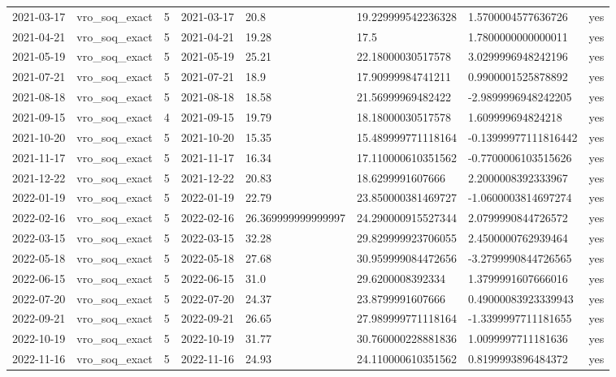 \begin{tabular}{llllllll}
2021-03-17 & vro\_soq\_exact & 5 & 2021-03-17 & 20.8 & 19.229999542236328 & 1.5700004577636726 & yes \\
2021-04-21 & vro\_soq\_exact & 5 & 2021-04-21 & 19.28 & 17.5 & 1.7800000000000011 & yes \\
2021-05-19 & vro\_soq\_exact & 5 & 2021-05-19 & 25.21 & 22.18000030517578 & 3.0299996948242196 & yes \\
2021-07-21 & vro\_soq\_exact & 5 & 2021-07-21 & 18.9 & 17.90999984741211 & 0.9900001525878892 & yes \\
2021-08-18 & vro\_soq\_exact & 5 & 2021-08-18 & 18.58 & 21.56999969482422 & -2.9899996948242205 & yes \\
2021-09-15 & vro\_soq\_exact & 4 & 2021-09-15 & 19.79 & 18.18000030517578 & 1.609999694824218 & yes \\
2021-10-20 & vro\_soq\_exact & 5 & 2021-10-20 & 15.35 & 15.489999771118164 & -0.13999977111816442 & yes \\
2021-11-17 & vro\_soq\_exact & 5 & 2021-11-17 & 16.34 & 17.110000610351562 & -0.7700006103515626 & yes \\
2021-12-22 & vro\_soq\_exact & 5 & 2021-12-22 & 20.83 & 18.6299991607666 & 2.2000008392333967 & yes \\
2022-01-19 & vro\_soq\_exact & 5 & 2022-01-19 & 22.79 & 23.850000381469727 & -1.0600003814697274 & yes \\
2022-02-16 & vro\_soq\_exact & 5 & 2022-02-16 & 26.369999999999997 & 24.290000915527344 & 2.0799990844726572 & yes \\
2022-03-15 & vro\_soq\_exact & 5 & 2022-03-15 & 32.28 & 29.829999923706055 & 2.4500000762939464 & yes \\
2022-05-18 & vro\_soq\_exact & 5 & 2022-05-18 & 27.68 & 30.959999084472656 & -3.2799990844726565 & yes \\
2022-06-15 & vro\_soq\_exact & 5 & 2022-06-15 & 31.0 & 29.6200008392334 & 1.3799991607666016 & yes \\
2022-07-20 & vro\_soq\_exact & 5 & 2022-07-20 & 24.37 & 23.8799991607666 & 0.49000083923339943 & yes \\
2022-09-21 & vro\_soq\_exact & 5 & 2022-09-21 & 26.65 & 27.989999771118164 & -1.3399997711181655 & yes \\
2022-10-19 & vro\_soq\_exact & 5 & 2022-10-19 & 31.77 & 30.760000228881836 & 1.0099997711181636 & yes \\
2022-11-16 & vro\_soq\_exact & 5 & 2022-11-16 & 24.93 & 24.110000610351562 & 0.8199993896484372 & yes \\

\end{tabular}
